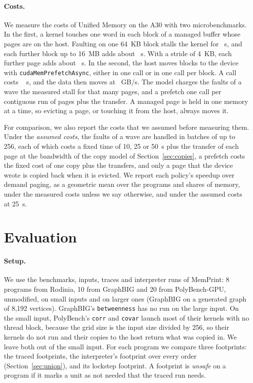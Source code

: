\documentclass[11pt]{article}
\newcommand{\memprint}{MemPrint}
\newcommand{\secref}[1]{Section~\ref{#1}}
\newcommand{\term}[1]{\emph{#1}}
\newcommand{\code}[1]{\texttt{#1}}
\begin{document}
\paragraph{Costs.} We measure the costs of Unified Memory on the A30 with two microbenchmarks. In the first, a
kernel touches one word in each block of a managed buffer whose pages are on the host. Faulting on one 64~KB block
stalls the kernel for \numUvmFaultOneUs{}~\textmu s, and each further block up to 16~MB adds about
\numUvmFaultPerBlockUs{}~\textmu s. With a stride of 4~KB, each further page adds about
\numUvmFaultPerPageFourUs{}~\textmu s. In the second, the host moves blocks to the device with
\code{cudaMemPrefetchAsync}, either in one call or in one call per block. A call costs \numUvmPrefetchCallUs{}~\textmu
s, and the data then moves at \numUvmPrefetchGBs{}~GB/s. The model charges the faults of a wave the measured stall
for that many pages, and a prefetch one call per contiguous run of pages plus the transfer. A managed page is held
in one memory at a time, so evicting a page, or touching it from the host, always moves it.

For comparison, we also report the costs that we assumed before measuring them. Under the \term{assumed costs}, the
faults of a wave are handled in batches of up to 256, each of which costs a fixed time of 10, 25 or 50~\textmu s
plus the transfer of each page at the bandwidth of the copy model of \secref{sec:copies}, a prefetch costs the fixed
cost of one copy plus the transfers, and only a page that the device wrote is copied back when it is evicted. We
report each policy's speedup over demand paging, as a geometric mean over the programs and shares of memory, under
the measured costs unless we say otherwise, and under the assumed costs at 25~\textmu s.

\section{Evaluation}
\label{sec:eval}

\paragraph{Setup.} We use the benchmarks, inputs, traces and interpreter runs of \memprint{}: 8 programs from
Rodinia, 10 from GraphBIG and 20 from PolyBench-GPU, unmodified, on small inputs and on larger ones (GraphBIG on a
generated graph of 8{,}192 vertices). GraphBIG's \code{betweenness} has no run on the large input. On the small
input, PolyBench's \code{corr} and \code{covar} launch most of their kernels with no thread block, because the grid
size is the input size divided by 256, so their kernels do not run and their copies to the host return what was
copied in. We leave both out of the small input. For each program we compare three footprints: the traced
footprints, the interpreter's footprint over every order (\secref{sec:union}), and its lockstep footprint. A
footprint is \term{unsafe} on a program if it marks a unit as not needed that the traced run needs.
\end{document}
